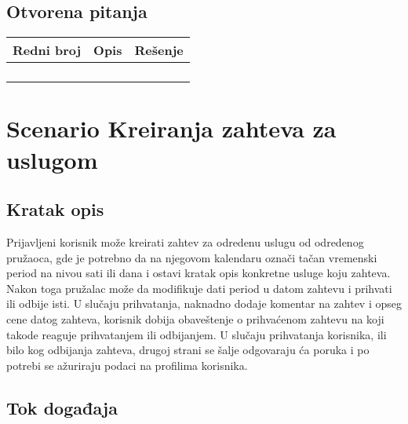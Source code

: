 \documentclass[a4paper,12pt]{report}
\newcommand{\genitivfunkcionalnosti}{Kreiranja zahteva za uslugom}
\begin{document}
		\subsection{Otvorena pitanja}
			\begin{tabular}{ |c|p{10cm}|l| }
				\hline
				\textbf{Redni broj} & \textbf{Opis} & \textbf{Rešenje} \\ 
				\hline
			    & &  \\
				\hline
			    &  & \\
				\hline
				&  & \\
				\hline
				&  & \\
				\hline
			\end{tabular}
	\section{Scenario \genitivfunkcionalnosti}
		\subsection{Kratak opis}
			Prijavljeni korisnik može kreirati zahtev za odredenu uslugu od odredenog pružaoca, gde je potrebno da na njegovom kalendaru označi tačan vremenski period na nivou sati ili dana i ostavi kratak opis konkretne usluge koju zahteva. Nakon toga pružalac može da modifikuje dati period u datom zahtevu i prihvati ili odbije isti. U slučaju prihvatanja, naknadno dodaje komentar na zahtev i opseg cene datog zahteva, korisnik dobija obaveštenje o prihvaćenom zahtevu na koji takode reaguje prihvatanjem ili odbijanjem. U slučaju prihvatanja korisnika, ili bilo kog odbijanja zahteva, drugoj strani se šalje odgovaraju ća poruka i po potrebi se ažuriraju podaci na profilima korisnika.
		\newpage
		\subsection{Tok događaja}
\end{document}

